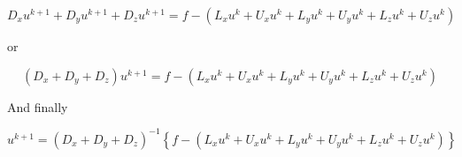 \documentclass[11pt]{article}
\begin{document}
\begin{equation}
	D_x u^{k+1} +
	D_y u^{k+1} +
	D_z u^{k+1}
	 = f - (
	L_x u^{k} + U_x u^{k} +
	L_y u^{k} + U_y u^{k} +
	L_z u^{k} + U_z u^{k}
	)
\end{equation}

or

\begin{equation}
	(D_x + D_y + D_z) u^{k+1}
	 = f - (
	L_x u^{k} + U_x u^{k} +
	L_y u^{k} + U_y u^{k} +
	L_z u^{k} + U_z u^{k}
	)
\end{equation}

And finally

\begin{equation}
	u^{k+1}
	 = 
	(D_x + D_y + D_z)^{-1}
	\left\{
	f - (
	L_x u^{k} + U_x u^{k} +
	L_y u^{k} + U_y u^{k} +
	L_z u^{k} + U_z u^{k}
	) \right\}
\end{equation}
\end{document}
